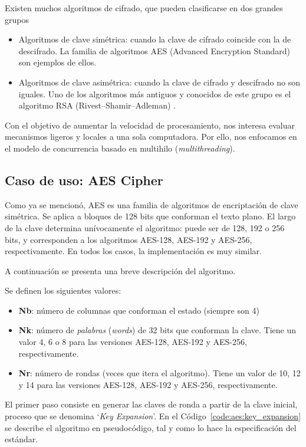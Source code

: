 \documentclass[11pt]{article}
\let\Oldsubsection\subsection
\renewcommand{\subsection}{\FloatBarrier\Oldsubsection}
\newcommand{\english}[1]{\textit{#1}}
\newcommand{\technical}[1]{\textit{#1}}
\begin{document}
Existen muchos algoritmos de cifrado, que pueden clasificarse en dos grandes grupos

\begin{itemize}
    \item Algoritmos de clave simétrica: cuando la clave de cifrado coincide con la de descifrado. La familia de algoritmos AES (Advanced Encryption Standard) \cite{aes:aes} son ejemplos de ellos.
    \item Algoritmos de clave asimétrica: cuando la clave de cifrado y descifrado no son iguales. Uno de los algoritmos más antiguos y conocidos de este grupo es el algoritmo RSA (Rivest–Shamir–Adleman) \cite{aes:rsa}.
\end{itemize}

Con el objetivo de aumentar la velocidad de procesamiento, nos interesa evaluar mecanismos ligeros y locales a una sola computadora. Por ello, nos enfocamos en el modelo de concurrencia basado en multihilo (\english{multithreading}).

\subsection{Caso de uso: AES Cipher}

Como ya se mencionó, AES es una familia de algoritmos de encriptación de clave simétrica. Se aplica a bloques de 128 bits que conforman el texto plano. El largo de la clave determina unívocamente el algoritmo: puede ser de 128, 192 o 256 bits, y corresponden a los algoritmos AES-128, AES-192 y AES-256, respectivamente. En todos los casos, la implementación es muy similar.

A continuación se presenta una breve descripción del algoritmo.

Se definen los siguientes valores:

\begin{itemize}
    \item \textbf{Nb}: número de columnas que conforman el estado (siempre son 4)
    \item \textbf{Nk}: número de \technical{palabras} (\english{words}) de 32 bits que conforman la clave. Tiene un valor 4, 6 o 8 para las versiones AES-128, AES-192 y AES-256, respectivamente.
    \item \textbf{Nr}: número de rondas (veces que itera el algoritmo). Tiene un valor de 10, 12 y 14 para las versiones AES-128, AES-192 y AES-256, respectivamente.
\end{itemize}

El primer paso consiste en generar las claves de ronda a partir de la clave inicial, proceso que se denomina `\english{Key Expansion}'. En el Código~\ref{code:aes:key_expansion} se describe el algoritmo en pseudocódigo, tal y como lo hace la especificación del estándar.
\end{document}
